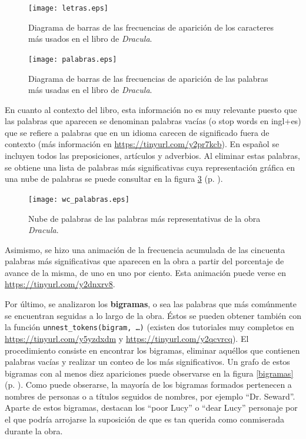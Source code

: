 \documentclass[paper=leter, fontsize=11pt]{scrartcl}
\numberwithin{equation}{section}		%
\numberwithin{figure}{section}			%
\numberwithin{table}{section}				%
\begin{document}
\begin{figure}
    \centering
    \texttt{[image: letras.eps]}
    \caption{Diagrama de barras de las frecuencias de aparición de los caracteres más usados en el libro de \textit{Dracula}.}
    \label{letras}
\end{figure}

\begin{figure}
    \centering
    \texttt{[image: palabras.eps]}
    \caption{Diagrama de barras de las frecuencias de aparición de las palabras más usadas en el libro de \textit{Dracula}.}
    \label{palabras}
\end{figure}

En cuanto al contexto del libro, esta información no es muy relevante puesto que las palabras que aparecen se denominan palabras vacías (o stop words en ingl+es) que se refiere a palabras que en un idioma carecen de significado fuera de contexto (más información en \url{https://tinyurl.com/y2pr7kcb}). En español se incluyen todos las preposiciones, artículos y adverbios. Al eliminar estas palabras, se obtiene una lista de palabras más significativas cuya representación gráfica en una nube de palabras se puede consultar en la figura \ref{wc_palabras} (p. \pageref{wc_palabras}).

\begin{figure}
    \centering
    \texttt{[image: wc\_palabras.eps]}
    \caption{Nube de palabras de las palabras más representativas de la obra \textit{Dracula}.}
    \label{wc_palabras}
\end{figure}

Asimismo, se hizo una animación de la frecuencia acumulada de las cincuenta palabras más significativas que aparecen en la obra a partir del porcentaje de avance de la misma, de uno en uno por ciento. Esta animación puede verse en \url{https://tinyurl.com/y2dnxrv8}.

Por último, se analizaron los \textbf{bigramas}, o sea las palabras que más comúnmente se encuentran seguidas a lo largo de la obra. Éstos se pueden obtener también con la función \texttt{unnest\_tokens(bigram, \ldots)} (existen dos tutoriales muy completos en \url{https://tinyurl.com/y5yzdxdm} y \url{https://tinyurl.com/y2qcvrcq}). El procedimiento consiste en encontrar los bigramas, eliminar aquéllos que contienen palabras vacías y realizar un conteo de los más significativos. Un grafo de estos bigramas con al menos diez apariciones puede observarse en la figura \ref{bigramas} (p. \pageref{bigramas}). Como puede obserarse, la mayoría de los bigramas formados pertenecen a nombres de personas o a títulos seguidos de nombres, por ejemplo ``Dr. Seward''. Aparte de estos bigramas, destacan los ``poor Lucy'' o ``dear Lucy'' personaje por el que podría arrojarse la suposición de que es tan querida como conmiserada durante la obra.
\end{document}
